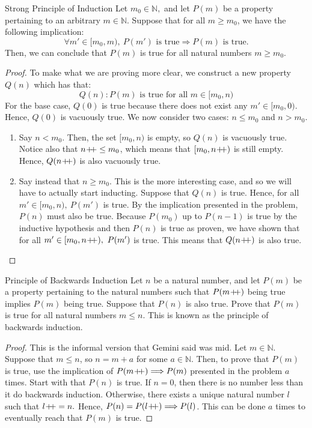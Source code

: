 \begin{problem}{Strong Principle of Induction}
    Let $m_0 \in \mathbb{N},$ and let $P(m)$ be a property pertaining to an arbitrary $m \in \mathbb{N}$.
    Suppose that for all $m \geq m_0$, we have the following implication:
    $$\forall m' \in [m_0, m), \ P(m') \text{ is true} \Longrightarrow P(m)  \text{ is true.}$$
    Then, we can conclude that $P(m)$ is true for all natural numbers $m \geq m_0.$
\end{problem}
\begin{proof}
    To make what we are proving more clear, we construct a new property $Q(n)$ which has that:
    $$Q(n) : P(m) \text{ is true for all } m \in [m_0, n)$$
    For the base case, $Q(0)$ is true because there does not exist any $m' \in [m_0, 0)$. 
    Hence, $Q(0)$ is vacuously true.
    We now consider two cases: $n \leq m_0$ and $n > m_0.$
    \begin{enumerate}
        \item Say $n < m_0$. 
        Then, the set $[m_0, n)$ is empty, so $Q(n)$ is vacuously true.
        Notice also that $n \! +\!\!\!+ \leq m_0$, which means that $[m_0, n \! +\!\!\!+)$ is still empty.
        Hence, $Q(n \! +\!\!\!+)$ is also vacuously true.
        \item Say instead that $n \geq m_0.$ 
        This is the more interesting case, and so we will have to actually start inducting.
        Suppose that $Q(n)$ is true.
        Hence, for all $m' \in [m_0, n), \ P(m')$ is true. 
        By the implication presented in the problem, $P(n)$ must also be true.
        Because $P(m_0)$ up to $P(n-1)$ is true by the inductive hypothesis and then $P(n)$ is true as proven, we have shown that for all $m' \in [m_0, n \! +\!\!\!+), \ P(m')$ is true. 
        This means that $Q(n \! +\!\!\!+)$ is also true.
    \end{enumerate}
\end{proof}

\begin{problem}{Principle of Backwards Induction}
    Let $n$ be a natural number, and let $P(m)$ be a property pertaining to the natural numbers such that $P(m \! +\!\!\!+)$ being true implies $P(m)$ being true.
    Suppose that $P(n)$ is also true.
    Prove that $P(m)$ is true for all natural numbers $m \leq n$.
    This is known as the principle of backwards induction.
\end{problem}
\begin{proof}
    This is the informal version that Gemini said was mid. Let $m \in \mathbb{N}$. 
    Suppose that $m \leq n$, so $n = m + a$ for some $a \in \mathbb{N}$.
    Then, to prove that $P(m)$ is true, use the implication of $P(m \! +\!\!\!+) \Longrightarrow P(m)$ presented in the problem $a$ times. 
    Start with that $P(n)$ is true. 
    If $n = 0$, then there is no number less than it do backwards induction.
    Otherwise, there exists a unique natural number $l$ such that $l \! +\!\!\!+ = n.$
    Hence, $P(n) = P(l \! +\!\!\!+) \Longrightarrow P(l)$.
    This can be done $a$ times to eventually reach that $P(m)$ is true.
\end{proof}


